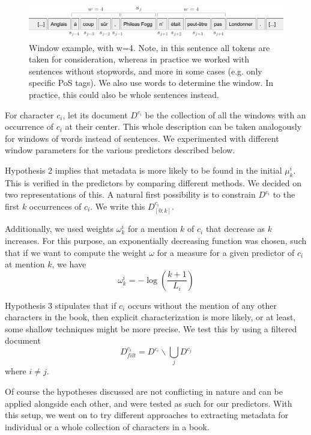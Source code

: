 \begin{figure}
\includegraphics[width=\textwidth]{fig/window.png}
\caption{Window example, with w=4. Note, in  this sentence all tokens are taken for consideration, whereas in practice we worked with sentences without stopwords, and more in some cases (e.g. only specific PoS tags). We also use words to determine the window. In practice, this could also be whole sentences instead.}
\label{fig:window}
\end{figure}

For character $c_i$, let its document $D^{c_i}$ be the collection of all the windows with an occurrence of $c_i$ at their center. This whole description can be taken analogously for windows of words instead of sentences. We experimented with different window parameters for the various predictors described below. 

\vspace*{1em}
Hypothesis 2 implies that metadata is more likely to be found in the initial $\mu^i_k$. This is verified in the predictors by comparing different methods. We decided on two representations of this. A natural first possibility is to constrain $D^{c_i}$ to the first $k$ occurrences of $c_i$. We write this $D^{c_i}_{[0:k]}$. 

Additionally, we used weights $\omega^i_k$ for a mention $k$ of $c_i$ that decrease as $k$ increases. For this purpose, an exponentially decreasing function was chosen, such that if we want to compute the weight $\omega$ for a measure for a given predictor of $c_i$ at mention $k$, we have
\begin{equation}
\omega^i_k = -\log (\frac{k+1}{L_i})
\end{equation}


Hypothesis 3 stipulates that if $c_i$ occurs without the mention of any other characters in the book, then explicit characterization is more likely, or at least, some shallow techniques might be more precise. We test this by using a filtered document 
\begin{equation}
D^{c_i}_{filt} = D^{c_i} \backslash \bigcup_j D^{c_j}
\end{equation}
where $i \neq j$. 

Of course the hypotheses discussed are not conflicting in nature and can be applied alongside each other, and were tested as such for our predictors. With this setup, we went on to try different approaches to extracting metadata for individual or a whole collection of characters in a book.

